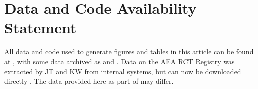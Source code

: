 \documentclass[PP]{AEA}
\begin{document}
\section{Data and Code Availability Statement}
\label{sec:dcas}

All data and code used to generate figures and tables in this article can be found at \citet{E117884V1}, with some data archived as \citet{E117873V1} and \citet{E117876V1}. Data on the AEA RCT Registry was extracted by JT and KW from internal systems, but can now be downloaded directly \citep{DVN/DFMLIU_2020}. The data provided here as part of \citet{E117884V1} may differ.

\FloatBarrier
%
%



\appendix


\end{document}
